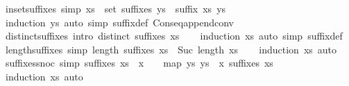 \begin{isabellebody}
\isanewline
{}\isamarkupfalse%
\ in{\isacharunderscore}set{\isacharunderscore}suffixes\ {\isacharbrackleft}simp{\isacharbrackright}{\isacharcolon}\ {\isachardoublequoteopen}xs\ {\isasymin}\ set\ {\isacharparenleft}suffixes\ ys{\isacharparenright}\ {\isasymlongleftrightarrow}\ suffix\ xs\ ys{\isachardoublequoteclose}\isanewline
%
\isadelimproof
\ \ %
\endisadelimproof
%
\isatagproof
{}\isamarkupfalse%
\ {\isacharparenleft}induction\ ys{\isacharparenright}\ {\isacharparenleft}auto\ simp{\isacharcolon}\ suffix{\isacharunderscore}def\ Cons{\isacharunderscore}eq{\isacharunderscore}append{\isacharunderscore}conv{\isacharparenright}%
\endisatagproof
{\isafoldproof}%
%
\isadelimproof
\isanewline
%
\endisadelimproof
\isanewline
{}\isamarkupfalse%
\ distinct{\isacharunderscore}suffixes\ {\isacharbrackleft}intro{\isacharbrackright}{\isacharcolon}\ {\isachardoublequoteopen}distinct\ {\isacharparenleft}suffixes\ xs{\isacharparenright}{\isachardoublequoteclose}\isanewline
%
\isadelimproof
\ \ %
\endisadelimproof
%
\isatagproof
{}\isamarkupfalse%
\ {\isacharparenleft}induction\ xs{\isacharparenright}\ {\isacharparenleft}auto\ simp{\isacharcolon}\ suffix{\isacharunderscore}def{\isacharparenright}%
\endisatagproof
{\isafoldproof}%
%
\isadelimproof
\isanewline
%
\endisadelimproof
\isanewline
{}\isamarkupfalse%
\ length{\isacharunderscore}suffixes\ {\isacharbrackleft}simp{\isacharbrackright}{\isacharcolon}\ {\isachardoublequoteopen}length\ {\isacharparenleft}suffixes\ xs{\isacharparenright}\ {\isacharequal}\ Suc\ {\isacharparenleft}length\ xs{\isacharparenright}{\isachardoublequoteclose}\isanewline
%
\isadelimproof
\ \ %
\endisadelimproof
%
\isatagproof
{}\isamarkupfalse%
\ {\isacharparenleft}induction\ xs{\isacharparenright}\ auto%
\endisatagproof
{\isafoldproof}%
%
\isadelimproof
\isanewline
%
\endisadelimproof
\isanewline
{}\isamarkupfalse%
\ suffixes{\isacharunderscore}snoc\ {\isacharbrackleft}simp{\isacharbrackright}{\isacharcolon}\ {\isachardoublequoteopen}suffixes\ {\isacharparenleft}xs\ {\isacharat}\ {\isacharbrackleft}x{\isacharbrackright}{\isacharparenright}\ {\isacharequal}\ {\isacharbrackleft}{\isacharbrackright}\ {\isacharhash}\ map\ {\isacharparenleft}{\isasymlambda}ys{\isachardot}\ ys\ {\isacharat}\ {\isacharbrackleft}x{\isacharbrackright}{\isacharparenright}\ {\isacharparenleft}suffixes\ xs{\isacharparenright}{\isachardoublequoteclose}\isanewline
%
\isadelimproof
\ \ %
\endisadelimproof
%
\isatagproof
{}\isamarkupfalse%
\ {\isacharparenleft}induction\ xs{\isacharparenright}\ auto%

\end{isabellebody}
